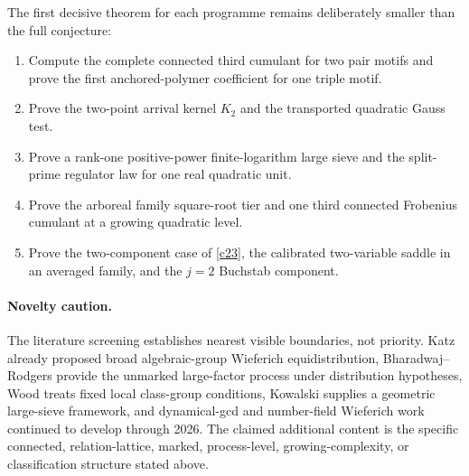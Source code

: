 \documentclass[11pt]{article}
\begin{document}
The first decisive theorem for each programme remains deliberately smaller than the full
conjecture:
\begin{enumerate}
\item Compute the complete connected third cumulant for two pair motifs and prove the
first anchored-polymer coefficient for one triple motif.
\item Prove the two-point arrival kernel $K_2$ and the transported quadratic Gauss test.
\item Prove a rank-one positive-power finite-logarithm large sieve and the split-prime
regulator law for one real quadratic unit.
\item Prove the arboreal family square-root tier and one third connected Frobenius
cumulant at a growing quadratic level.
\item Prove the two-component case of \cref{c23}, the calibrated two-variable saddle in
an averaged family, and the $j=2$ Buchstab component.
\end{enumerate}

\paragraph{Novelty caution.}
The literature screening establishes nearest visible boundaries, not priority.  Katz
already proposed broad algebraic-group Wieferich equidistribution,
Bharadwaj--Rodgers provide the unmarked large-factor process under distribution
hypotheses, Wood treats fixed local class-group conditions, Kowalski supplies a geometric
large-sieve framework, and dynamical-gcd and number-field Wieferich work continued to
develop through 2026.  The claimed additional content is the specific connected,
relation-lattice, marked, process-level, growing-complexity, or classification structure
stated above.
\end{document}
